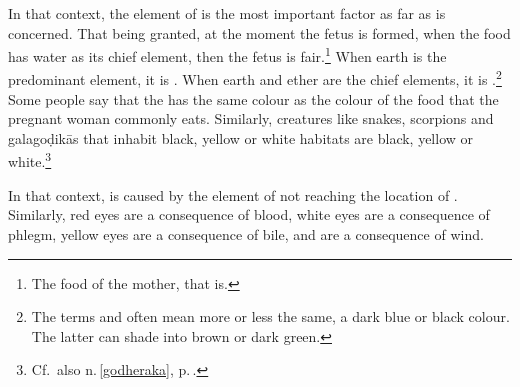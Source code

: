 \begin{translation}
In that context, the element of  is the most important
factor as far as  is concerned. That being
granted, at the moment the fetus is formed, when the food has water as
its chief element, then the fetus is fair.\footnote{The food of the
    mother, that is.}  When earth is the predominant element, it is
    . When earth and ether are the chief elements, it is
    .\footnote{The terms  and 
        often mean more or less the same, a dark blue or black colour. The
        latter can shade into brown or dark green.}  Some people say that the
         has the same colour as the colour of the food
        that the pregnant woman commonly eats. Similarly, creatures like
        snakes, scorpions and \glspl{galagoḍikā} that inhabit black, yellow or
        white habitats are black, yellow or
        white.\footnote{\label{galagodika}Cf.\ also n.\,\ref{godheraka},
            p.\,\pageref{godheraka}.} 
            
            In that context,  is caused by the
            element of  not reaching the location of
            .  Similarly, red eyes are a consequence of blood,
            white eyes are a consequence of phlegm, yellow eyes are a 
            consequence of bile, and  are a 
            consequence of wind.
  


\end{translation}
